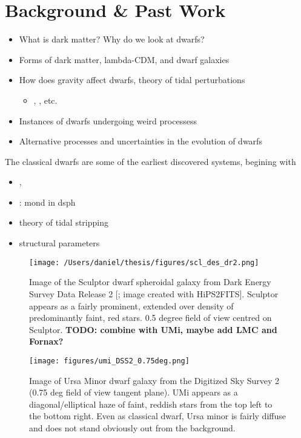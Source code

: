 \section{Background \& Past Work}\label{background-past-work}

\begin{itemize}
\tightlist
\item
  What is dark matter? Why do we look at dwarfs?
\item
  Forms of dark matter, lambda-CDM, and dwarf galaxies
\item
  How does gravity affect dwarfs, theory of tidal perturbations

  \begin{itemize}
  \tightlist
  \item
    \citet{EN2021}, \citet{PNM2008}, etc.
  \end{itemize}
\item
  Instances of dwarfs undergoing weird processess
\item
  Alternative processes and uncertainties in the evolution of dwarfs
\end{itemize}

The classical dwarfs are some of the earliest discovered systems,
begining with \citet{shapley1938}

\begin{itemize}
\tightlist
\item
  \citet{fattahi+2013}, \citet{fattahi+2018}
\item
  \citet{sanchez-salcedo+hernandez2007}: mond in dsph
\item
  \citet{mayer+2001} theory of tidal stripping
\item
  \citet{IH1995} structural parameters
\end{itemize}

\begin{figure}
\centering
\texttt{[image: /Users/daniel/thesis/figures/scl\_des\_dr2.png]}
\caption[Picture of Sculptor]{Image of the Sculptor dwarf spheroidal
galaxy from Dark Energy Survey Data Release 2 {[}\citet{abbott+2021};
image created with HiPS2FITS{]}. Sculptor appears as a fairly prominent,
extended over density of predominantly faint, red stars. 0.5 degree
field of view centred on Sculptor. \textbf{TODO: combine with UMi, maybe
add LMC and Fornax?}}\label{fig:scl_image}
\end{figure}

\begin{figure}
\centering
\texttt{[image: figures/umi\_DSS2\_0.75deg.png]}
\caption[Picture of Ursa Minor]{Image of Ursa Minor dwarf galaxy from
the Digitized Sky Survey 2 (0.75 deg field of view tangent plane). UMi
appears as a diagonal/elliptical haze of faint, reddish stars from the
top left to the bottom right. Even as classical dwarf, Ursa minor is
fairly diffuse and does not stand obviously out from the
background.}\label{fig:umi_image}
\end{figure}

